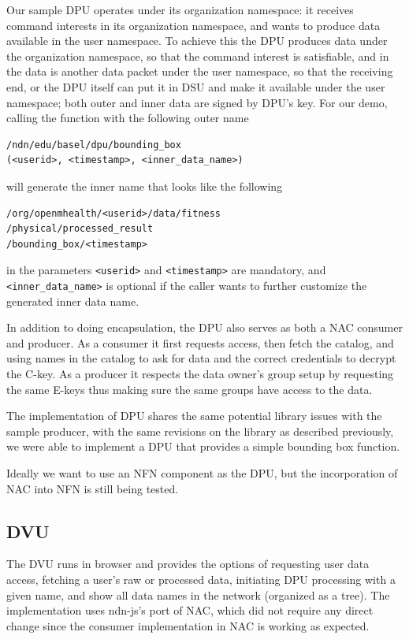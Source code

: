 \documentclass[letterpaper,twocolumn,11pt]{article}
\begin{document}
Our sample DPU operates under its organization namespace: it receives command interests in its organization namespace, and wants to produce data available in the user namespace. To achieve this the DPU produces data under the organization namespace, so that the command interest is satisfiable, and in the data is another data packet under the user namespace, so that the receiving end, or the DPU itself can put it in DSU and make it available under the user namespace; both outer and inner data are signed by DPU's key. For our demo, calling the function with the following outer name
\begin{verbatim}
/ndn/edu/basel/dpu/bounding_box
(<userid>, <timestamp>, <inner_data_name>)
\end{verbatim} 
will generate the inner name that looks like the following
\begin{verbatim}
/org/openmhealth/<userid>/data/fitness
/physical/processed_result
/bounding_box/<timestamp>
\end{verbatim}
in the parameters \verb|<userid>| and \verb|<timestamp>| are mandatory, and \verb|<inner_data_name>| is optional if the caller wants to further customize the generated inner data name.

In addition to doing encapsulation, the DPU also serves as both a NAC consumer and producer. As a consumer it first requests access, then fetch the catalog, and using names in the catalog to ask for data and the correct credentials to decrypt the C-key. As a producer it respects the data owner's group setup by requesting the same E-keys thus making sure the same groups have access to the data.

The implementation of DPU shares the same potential library issues with the sample producer, with the same revisions on the library as described previously, we were able to implement a DPU that provides a simple bounding box function.

Ideally we want to use an NFN component as the DPU, but the incorporation of NAC into NFN is still being tested.

\subsection{DVU}

The DVU runs in browser and provides the options of requesting user data access, fetching a user's raw or processed data, initiating DPU processing with a given name, and show all data names in the network (organized as a tree). The implementation uses ndn-js's port of NAC, which did not require any direct change since the consumer implementation in NAC is working as expected.
\end{document}
